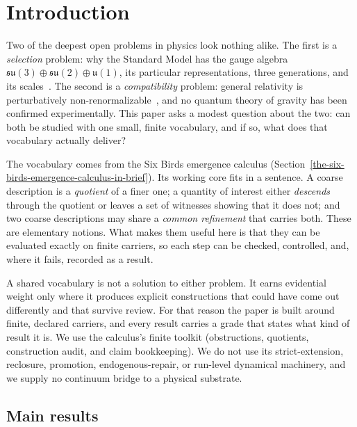 \section{Introduction}\label{introduction}

Two of the deepest open problems in physics look nothing alike. The first is a \emph{selection} problem: why the
Standard Model has the gauge algebra \(\mathfrak{su}(3)\oplus\mathfrak{su}(2)\oplus\mathfrak{u}(1)\), its particular
representations, three generations, and its scales~\citep{Weinberg1967}. The second is a \emph{compatibility}
problem: general relativity is perturbatively non-renormalizable~\citep{tHooftVeltman1974,GoroffSagnotti1985}, and
no quantum theory of gravity has been confirmed experimentally. This paper asks a modest question about the two: can
both be studied with one small, finite vocabulary, and if so, what does that vocabulary actually deliver?

The vocabulary comes from the Six Birds emergence calculus (Section~\ref{the-six-birds-emergence-calculus-in-brief}).
Its working core fits in a sentence. A coarse description is a \emph{quotient} of a finer one; a quantity of interest
either \emph{descends} through the quotient or leaves a set of
witnesses showing that it does not; and two
coarse descriptions may share a \emph{common refinement} that carries both. These are elementary notions. What makes
them useful here is that they can be evaluated exactly on finite carriers, so each step can be checked, controlled,
and, where it fails, recorded as a result.

A shared vocabulary is not a solution to either problem. It earns evidential weight only where it produces explicit
constructions that could have come out differently and that survive review. For that reason the paper is built
around finite, declared carriers, and every result carries a grade that states what kind of result it is. We use
the calculus's finite toolkit (obstructions, quotients, construction audit, and claim bookkeeping). We do not use its
strict-extension, reclosure, promotion, endogenous-repair, or run-level dynamical machinery, and we supply no
continuum bridge to a physical substrate.

\subsection*{Main results}

